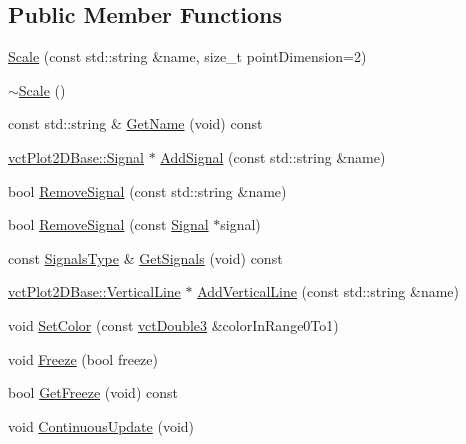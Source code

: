 \subsection*{Public Member Functions}
\begin{DoxyCompactItemize}
\item 
\hyperlink{classvct_plot2_d_base_1_1_scale_a1383daa58c4c2ce603a751ff9258558c}{Scale} (const std\-::string \&name, size\-\_\-t point\-Dimension=2)
\item 
\hyperlink{classvct_plot2_d_base_1_1_scale_ab718b2816c31e7a78093c198cd4aeefe}{$\sim$\-Scale} ()
\item 
const std\-::string \& \hyperlink{classvct_plot2_d_base_1_1_scale_a4b1a356d22ebfe5f277db5022f0219a6}{Get\-Name} (void) const 
\item 
\hyperlink{classvct_plot2_d_base_1_1_signal}{vct\-Plot2\-D\-Base\-::\-Signal} $\ast$ \hyperlink{classvct_plot2_d_base_1_1_scale_a67005ed4b0e8bd8c89a6b186f56fb212}{Add\-Signal} (const std\-::string \&name)
\item 
bool \hyperlink{classvct_plot2_d_base_1_1_scale_aaf43fbe7999fd1baba8fc8517fb4895b}{Remove\-Signal} (const std\-::string \&name)
\item 
bool \hyperlink{classvct_plot2_d_base_1_1_scale_a1126d671423cec3ae36a603ef3a92671}{Remove\-Signal} (const \hyperlink{classvct_plot2_d_base_1_1_signal}{Signal} $\ast$signal)
\item 
const \hyperlink{classvct_plot2_d_base_1_1_scale_aecdc247557c6ec3b7976596b42a4bc27}{Signals\-Type} \& \hyperlink{classvct_plot2_d_base_1_1_scale_a5e87d8b79805fa93432db0b84d428277}{Get\-Signals} (void) const 
\item 
\hyperlink{classvct_plot2_d_base_1_1_vertical_line}{vct\-Plot2\-D\-Base\-::\-Vertical\-Line} $\ast$ \hyperlink{classvct_plot2_d_base_1_1_scale_a84606196b9fb60404ea6cba5737b6e9f}{Add\-Vertical\-Line} (const std\-::string \&name)
\item 
void \hyperlink{classvct_plot2_d_base_1_1_scale_af435cf974388b55c8f044c3fc0d795c8}{Set\-Color} (const \hyperlink{vct_fixed_size_vector_types_8h_a4a89122c9d7f72c3f31fe8126e17c3af}{vct\-Double3} \&color\-In\-Range0\-To1)
\item 
void \hyperlink{classvct_plot2_d_base_1_1_scale_a396bd19c150f3a7542442b7afd8403a3}{Freeze} (bool freeze)
\item 
bool \hyperlink{classvct_plot2_d_base_1_1_scale_a70b4900ca146f2c700c0d7b800c8be98}{Get\-Freeze} (void) const 
\item 
void \hyperlink{classvct_plot2_d_base_1_1_scale_aecac590af41e0fd998fe7d8b6c91492e}{Continuous\-Update} (void)
\end{DoxyCompactItemize}
